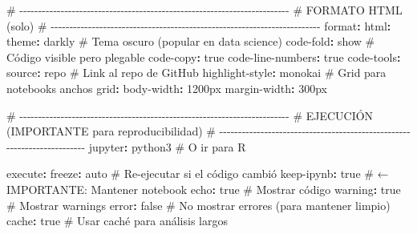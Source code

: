 \documentclass[
  doc,
  floatsintext,
  longtable,
  a4paper,
  nolmodern,
  notxfonts,
  notimes,
  12pt,
  colorlinks=true,linkcolor=blue,citecolor=blue,urlcolor=blue]{apa7}
\newenvironment{Shaded}{\begin{snugshade}}{\end{snugshade}}
\newcommand{\AttributeTok}[1]{\textcolor[rgb]{0.40,0.45,0.13}{#1}}
\newcommand{\CharTok}[1]{\textcolor[rgb]{0.13,0.47,0.30}{#1}}
\newcommand{\CommentTok}[1]{\textcolor[rgb]{0.37,0.37,0.37}{#1}}
\newcommand{\FunctionTok}[1]{\textcolor[rgb]{0.28,0.35,0.67}{#1}}
\newcommand{\KeywordTok}[1]{\textcolor[rgb]{0.00,0.23,0.31}{\textbf{#1}}}
\begin{document}
\begin{Shaded}
\begin{Highlighting}[]
\CommentTok{\# {-}{-}{-}{-}{-}{-}{-}{-}{-}{-}{-}{-}{-}{-}{-}{-}{-}{-}{-}{-}{-}{-}{-}{-}{-}{-}{-}{-}{-}{-}{-}{-}{-}{-}{-}{-}{-}{-}{-}{-}{-}{-}{-}{-}{-}{-}{-}{-}{-}{-}{-}{-}{-}{-}{-}{-}{-}{-}{-}{-}{-}{-}{-}{-}{-}{-}{-}{-}{-}{-}{-}{-}}
\CommentTok{\# FORMATO HTML (solo)}
\CommentTok{\# {-}{-}{-}{-}{-}{-}{-}{-}{-}{-}{-}{-}{-}{-}{-}{-}{-}{-}{-}{-}{-}{-}{-}{-}{-}{-}{-}{-}{-}{-}{-}{-}{-}{-}{-}{-}{-}{-}{-}{-}{-}{-}{-}{-}{-}{-}{-}{-}{-}{-}{-}{-}{-}{-}{-}{-}{-}{-}{-}{-}{-}{-}{-}{-}{-}{-}{-}{-}{-}{-}{-}{-}}
\FunctionTok{format}\KeywordTok{:}
\AttributeTok{  }\FunctionTok{html}\KeywordTok{:}
\AttributeTok{    }\FunctionTok{theme}\KeywordTok{:}\AttributeTok{ darkly}\CommentTok{           \# Tema oscuro (popular en data science)}
\AttributeTok{    }\FunctionTok{code{-}fold}\KeywordTok{:}\AttributeTok{ show}\CommentTok{         \# Código visible pero plegable}
\AttributeTok{    }\FunctionTok{code{-}copy}\KeywordTok{:}\AttributeTok{ }\CharTok{true}
\AttributeTok{    }\FunctionTok{code{-}line{-}numbers}\KeywordTok{:}\AttributeTok{ }\CharTok{true}
\AttributeTok{    }\FunctionTok{code{-}tools}\KeywordTok{:}
\AttributeTok{      }\FunctionTok{source}\KeywordTok{:}\AttributeTok{ repo}\CommentTok{          \# Link al repo de GitHub}
\AttributeTok{    }\FunctionTok{highlight{-}style}\KeywordTok{:}\AttributeTok{ monokai}
\AttributeTok{    }
\CommentTok{    \# Grid para notebooks anchos}
\AttributeTok{    }\FunctionTok{grid}\KeywordTok{:}
\AttributeTok{      }\FunctionTok{body{-}width}\KeywordTok{:}\AttributeTok{ 1200px}
\AttributeTok{      }\FunctionTok{margin{-}width}\KeywordTok{:}\AttributeTok{ 300px}

\CommentTok{\# {-}{-}{-}{-}{-}{-}{-}{-}{-}{-}{-}{-}{-}{-}{-}{-}{-}{-}{-}{-}{-}{-}{-}{-}{-}{-}{-}{-}{-}{-}{-}{-}{-}{-}{-}{-}{-}{-}{-}{-}{-}{-}{-}{-}{-}{-}{-}{-}{-}{-}{-}{-}{-}{-}{-}{-}{-}{-}{-}{-}{-}{-}{-}{-}{-}{-}{-}{-}{-}{-}{-}{-}}
\CommentTok{\# EJECUCIÓN (IMPORTANTE para reproducibilidad)}
\CommentTok{\# {-}{-}{-}{-}{-}{-}{-}{-}{-}{-}{-}{-}{-}{-}{-}{-}{-}{-}{-}{-}{-}{-}{-}{-}{-}{-}{-}{-}{-}{-}{-}{-}{-}{-}{-}{-}{-}{-}{-}{-}{-}{-}{-}{-}{-}{-}{-}{-}{-}{-}{-}{-}{-}{-}{-}{-}{-}{-}{-}{-}{-}{-}{-}{-}{-}{-}{-}{-}{-}{-}{-}{-}}
\FunctionTok{jupyter}\KeywordTok{:}\AttributeTok{ python3}\CommentTok{            \# O \textquotesingle{}ir\textquotesingle{} para R}

\FunctionTok{execute}\KeywordTok{:}
\AttributeTok{  }\FunctionTok{freeze}\KeywordTok{:}\AttributeTok{ auto}\CommentTok{              \# Re{-}ejecutar si el código cambió}
\AttributeTok{  }\FunctionTok{keep{-}ipynb}\KeywordTok{:}\AttributeTok{ }\CharTok{true}\CommentTok{          \# ← IMPORTANTE: Mantener notebook}
\AttributeTok{  }\FunctionTok{echo}\KeywordTok{:}\AttributeTok{ }\CharTok{true}\CommentTok{                \# Mostrar código}
\AttributeTok{  }\FunctionTok{warning}\KeywordTok{:}\AttributeTok{ }\CharTok{true}\CommentTok{             \# Mostrar warnings}
\AttributeTok{  }\FunctionTok{error}\KeywordTok{:}\AttributeTok{ }\CharTok{false}\CommentTok{              \# No mostrar errores (para mantener limpio)}
\AttributeTok{  }\FunctionTok{cache}\KeywordTok{:}\AttributeTok{ }\CharTok{true}\CommentTok{               \# Usar caché para análisis largos}


\end{Highlighting}
\end{Shaded}
\end{document}
